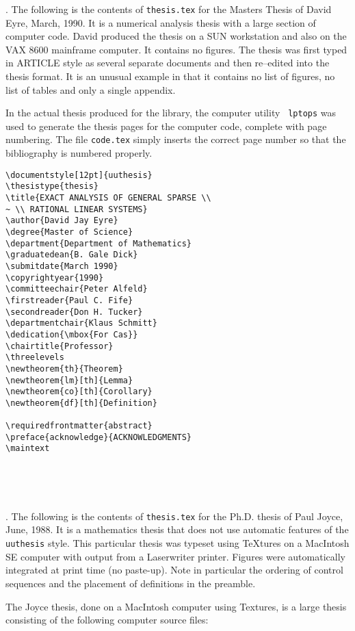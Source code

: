 . The following is the contents of
\verb|thesis.tex| for the Masters Thesis of David Eyre, March, 1990. It
is a numerical analysis thesis with a large section of computer code.
David produced the thesis on a SUN workstation and also on the VAX 8600
mainframe computer. It contains no figures. The thesis was first typed
in ARTICLE style as several separate documents and then re--edited into
the thesis format. It is an unusual example in that it contains no list
of figures, no list of tables and only a single appendix.

In the actual thesis produced for the library, the computer utility {\tt
lptops} was used to generate the thesis pages for the computer code,
complete with page numbering. The file {\tt code.tex} simply inserts the
correct page number so that the bibliography is numbered properly.

\begin{verbatim}
\documentstyle[12pt]{uuthesis}
\thesistype{thesis}
\title{EXACT ANALYSIS OF GENERAL SPARSE \\
~ \\ RATIONAL LINEAR SYSTEMS}
\author{David Jay Eyre}
\degree{Master of Science}
\department{Department of Mathematics}
\graduatedean{B. Gale Dick}
\submitdate{March 1990}
\copyrightyear{1990}
\committeechair{Peter Alfeld}
\firstreader{Paul C. Fife}
\secondreader{Don H. Tucker}
\departmentchair{Klaus Schmitt}
\dedication{\mbox{For Cas}}
\chairtitle{Professor}
\threelevels
\newtheorem{th}{Theorem}
\newtheorem{lm}[th]{Lemma}
\newtheorem{co}[th]{Corollary}
\newtheorem{df}[th]{Definition}

\requiredfrontmatter{abstract}
\preface{acknowledge}{ACKNOWLEDGMENTS}
\maintext





\end{verbatim}

. The following is the contents of
\verb|thesis.tex| for the Ph.D. thesis of Paul Joyce, June, 1988. It is
a mathematics thesis that does not use automatic features of the {\tt
uuthesis} style. This particular thesis was typeset using \TeX{}tures on
a MacIntosh SE computer with output from a Laserwriter printer. Figures
were automatically integrated at print time (no paste-up). Note in
particular the ordering of control sequences and the placement of
definitions in the preamble.

The Joyce thesis, done on a MacIntosh computer
using Textures,
is a large thesis consisting of the following computer source files:

